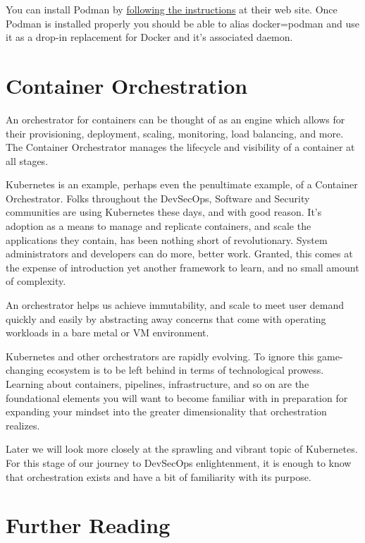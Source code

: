 \justify
You can install Podman by 
\href{https://podman.io/getting-started/installation.html}{following the instructions}
at their web site. Once Podman is installed properly you
should be able to alias docker=podman and use it as a
drop-in replacement for Docker and it's associated daemon.

\section{Container Orchestration}
\justify
An orchestrator for containers can be thought of as an engine which
allows for their provisioning, deployment, scaling, monitoring, load
balancing, and more. The Container Orchestrator manages the
lifecycle and visibility of a container at all stages.

\justify
Kubernetes is an example, perhaps even the
penultimate example, of a Container Orchestrator.
Folks throughout the DevSecOps, Software and
Security communities are using Kubernetes these days, and
with good reason. It's adoption as a means to manage and
replicate containers, and scale the applications they contain,
has been nothing short of revolutionary. System administrators
and developers can do more, better work. Granted, this comes at
the expense of introduction yet another framework to learn, and
no small amount of complexity.

\justify
An orchestrator helps us achieve immutability, and scale
to meet user demand quickly and easily by abstracting away
concerns that come with operating workloads in a bare metal
or VM environment.

\justify
Kubernetes and other orchestrators are rapidly evolving. To ignore this
game-changing ecosystem is to be left behind in terms of technological
prowess. Learning about containers, pipelines, infrastructure, and
so on are the foundational elements you will want to become familiar
with in preparation for expanding your mindset into the greater
dimensionality that orchestration realizes.

\justify
Later we will look more closely at the sprawling and vibrant 
topic of Kubernetes. For this stage of our journey to DevSecOps
enlightenment, it is enough to know that orchestration exists
and have a bit of familiarity with its purpose.

\section{Further Reading}
